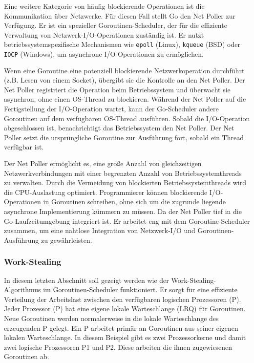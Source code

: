 \documentclass[fontsize=12pt,paper=a4,twoside=semi,parskip=half-,headsepline,headinclude]{scrreprt}
\begin{document}
Eine weitere Kategorie von häufig blockierende Operationen ist die Kommunikation über Netzwerke. Für diesen Fall stellt Go den Net Poller\cite{netpoll2024} zur Verfügung. Er ist ein spezieller Goroutinen-Scheduler, der für die effiziente Verwaltung von Netzwerk-I/O-Operationen zuständig ist. Er nutzt betriebssystemspezifische Mechanismen wie \texttt{epoll} (Linux), \texttt{kqueue} (BSD) oder \texttt{IOCP} (Windows), um asynchrone I/O-Operationen zu ermöglichen.

Wenn eine Goroutine eine potenziell blockierende Netzwerkoperation durchführt (z.B. Lesen von einem Socket), übergibt sie die Kontrolle an den Net Poller. Der Net Poller registriert die Operation beim Betriebssystem und überwacht sie asynchron, ohne einen OS-Thread zu blockieren. Während der Net Poller auf die Fertigstellung der I/O-Operation wartet, kann der Go-Scheduler andere Goroutinen auf dem verfügbaren OS-Thread ausführen. Sobald die I/O-Operation abgeschlossen ist, benachrichtigt das Betriebssystem den Net Poller. Der Net Poller setzt die ursprüngliche Goroutine zur Ausführung fort, sobald ein Thread verfügbar ist.

Der Net Poller ermöglicht es, eine große Anzahl von gleichzeitigen Netzwerkverbindungen mit einer begrenzten Anzahl von Betriebssystemthreads zu verwalten. Durch die Vermeidung von blockierten Betriebssystemthreads wird die CPU-Auslastung optimiert. Programmierer können blockierende I/O-Operationen in Goroutinen schreiben, ohne sich um die zugrunde liegende asynchrone Implementierung kümmern zu müssen. Da der Net Poller tief in die Go-Laufzeitumgebung integriert ist. Er arbeitet eng mit dem Goroutine-Scheduler zusammen, um eine nahtlose Integration von Netzwerk-I/O und Goroutinen-Ausführung zu gewährleisten. 

\subsubsection{Work-Stealing}
\label{subsubsec:workstealing}

In diesem letzten Abschnitt soll gezeigt werden wie der Work-Stealing-Algorithmus im Goroutinen-Scheduler funktioniert. Er sorgt für eine effiziente Verteilung der Arbeitslast zwischen den verfügbaren logischen Prozessoren (P). Jeder Prozessor (P) hat eine eigene lokale Warteschlange (LRQ) für Goroutinen. Neue Goroutinen werden normalerweise in die lokale Warteschlange des erzeugenden P gelegt. Ein P arbeitet primär an Goroutinen aus seiner eigenen lokalen Warteschlange. In diesem Beispiel gibt es zwei Prozessorkerne und damit zwei logische Prozessoren P1 und P2. Diese arbeiten die ihnen zugewiesenen Goroutinen ab.
\end{document}
